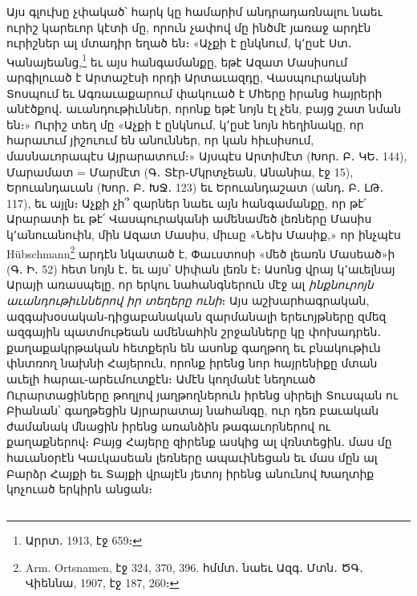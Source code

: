 \documentclass{article}
\begin{document}
{Այս գլուխը չփակած՝ հարկ կը համարիմ անդրադառնալու նաեւ ուրիշ կարեւոր կէտի մը, որուն չափով մը ինծմէ յառաջ արդէն ուրիշներ ալ մտադիր եղած են։ «Աչքի է ընկնում, կ՚ըսէ Ստ․ Կանայեանց,\footnote{Արրտ․ 1913, էջ 659։} եւ այս հանգամանքը, եթէ Ազատ Մասիսում արգիլուած է Արտաշէսի որդի Արտաւազդը, Վասպուրականի Տոսպում եւ Ագռաւաքարում փակուած է Մհերը իրանց հայրերի անէծքով․ աւանդութիւններ, որոնք եթէ նոյն էլ չեն, բայց շատ նման են։» Ուրիշ տեղ մը «Աչքի է ընկնում, կ՚ըսէ նոյն հեղինակը, որ հարաւում յիշուում են անուններ, որ կան հիւսիսում, մասնաւորապէս Այրարատում։» Այսպէս Արտիմէտ (Խոր․ Բ․ ԿԵ․ 144), Մարամատ = Մարմէտ (Գ․ Տէր֊Մկրտչեան, Անանիա, էջ 15), Երուանդաւան (Խոր․ Բ․ ԽՋ․ 123) եւ Երուանդաշատ (անդ․ Բ․ ԼԹ․ 117), եւ այլն։ Աչքի չի՞ զարներ նաեւ այն հանգամանքը, որ թէ՛ Արարատի եւ թէ՛ Վասպուրականի ամենամեծ լեռները Մասիս կ՚անուանուին, մին Ազատ Մասիս, միւսը «Նեխ Մասիք,» որ ինչպէս Hübschmann\footnote{Arm. Ortsnamen, էջ 324, 370, 396. հմմտ․ նաեւ Ազգ․ Մտն․ ԾԳ․ Վիեննա, 1907, էջ 187, 260։} արդէն նկատած է, Փաւստոսի «մեծ լեառն Մասեած»ի (Գ․ Ի․ 52) հետ նոյն է․ եւ այս՝ Սիփան լեռն է։ Ասոնց վրայ կ՚աւելնայ Արայի առասպելը, որ երկու նահանգներուն մէջ ալ \emph{ինքնուրոյն աւանդութիւններով իր տեղերը ունի}։ Այս աշխարհագրական, ազգախօսական֊դիցաբանական զարմանալի երեւոյթները զմեզ ազգային պատմութեան ամենահին շրջանները կը փոխադրեն․ քաղաքակրթական հետքերն են ասոնք գաղթող եւ բնակութիւն փնտռող նախնի Հայերուն, որոնք իրենց նոր հայրենիքը մտան աւելի հարաւ֊արեւմուտքէն։ Ամէն կողմանէ նեղուած Ուրարտացիները թողլով յաղթողներուն իրենց սիրելի Տուսպան ու Բիանան՝ գաղթեցին Այրարատայ նահանգը, ուր դեռ բաւական ժամանակ մնացին իրենց առանձին թագաւորներով ու քաղաքներով։ Բայց Հայերը զիրենք ասկից ալ վռնտեցին․ մաս մը հաւանօրէն Կաւկասեան լեռները ապաւինեցան եւ մաս մըն ալ Բարձր Հայքի եւ Տայքի վրայէն յետոյ իրենց անունով Խաղտիք կոչուած երկիրն անցան։}
\clearpage
\subsection{}
\end{document}
